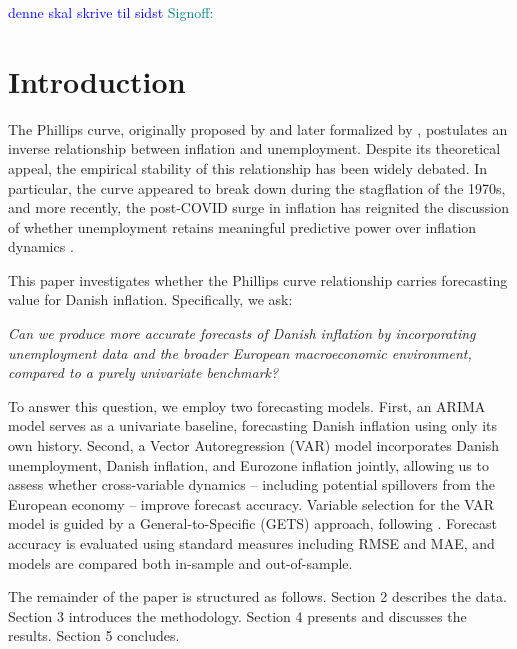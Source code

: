 \textcolor{blue}{denne skal skrive til sidst}\newline
\textcolor{teal}{Signoff:}\newline
\bigskip

\chapter{Introduction}\label{sec:introduction}
The Phillips curve, originally proposed by \cite{phillips1958} and later 
formalized by \cite{samuelson1960}, postulates an inverse relationship between 
inflation and unemployment. Despite its theoretical appeal, the empirical 
stability of this relationship has been widely debated. In particular, the 
curve appeared to break down during the stagflation of the 1970s, and more 
recently, the post-COVID surge in inflation has reignited the discussion of 
whether unemployment retains meaningful predictive power over inflation dynamics 
\parencite{stock2019}.

This paper investigates whether the Phillips curve relationship carries 
forecasting value for Danish inflation. Specifically, we ask: 
\begin{center}
    \textit{Can we produce more accurate forecasts of Danish inflation by incorporating unemployment data and the broader European macroeconomic environment, compared to a purely univariate benchmark?}
\end{center}
To answer this question, we employ two forecasting models. First, an 
ARIMA model serves as a univariate baseline, forecasting Danish inflation using 
only its own history. Second, a Vector Autoregression (VAR) model incorporates 
Danish unemployment, Danish inflation, and Eurozone inflation jointly, allowing 
us to assess whether cross-variable dynamics -- including potential spillovers 
from the European economy -- improve forecast accuracy. Variable selection for 
the VAR model is guided by a General-to-Specific (GETS) approach, following 
\cite{doornik2014}. Forecast accuracy is evaluated using standard measures 
including RMSE and MAE, and models are compared both in-sample and 
out-of-sample.

The remainder of the paper is structured as follows. Section 2 describes the 
data. Section 3 introduces the methodology. Section 4 presents and discusses 
the results. Section 5 concludes.


